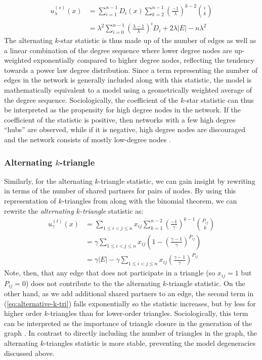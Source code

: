  \begin{align}
 \label{eq:alternative-k-star}
 u_\lambda^{(s)}(x) & = \sum_{i = 1}^{n-1} D_i(x) \sum_{k = 2}^{n-1} \left(\frac{-1}{\lambda}\right)^{k-2} \binom{i}{k}   \nonumber\\
 & =  \lambda^2 \sum_{i = 0}^{n-1} \left(\frac{\lambda - 1}{\lambda}\right)^i D_i + 2 \lambda |E| - n \lambda^2
 \end{align}
The alternating $k$-star statistic is thus made up of the number of edges as well as a linear combination of the degree sequence where lower degree nodes are up-weighted exponentially compared to higher degree nodes, reflecting the tendency towards a power law degree distribution. Since a term representing the number of edges in the network is generally included along with this statistic, the model is mathematically equivalent to a model using a geometrically weighted average of the degree sequence. Sociologically, the coefficient of the $k$-star statistic can thus be interpreted as the propensity for high degree nodes in the network. If the coefficient of the statistic is positive, then networks with a few high degree ``hubs'' are observed, while if it is negative, high degree nodes are discouraged and the network consists of mostly low-degree nodes \cite{Sni+06}.
 
\subsubsection{Alternating $k$-triangle}
 
 Similarly, for the alternating $k$-triangle statistic, we can gain insight by rewriting in terms of the number of shared partners for pairs of nodes. By using this representation of $k$-triangles from  along with the binomial theorem, we can rewrite the \emph{alternating $k$-triangle} statistic as:
\begin{align}
 \label{eq:alternative-k-tri}
u_\gamma^{(t)}(x) & = \sum_{1 \leq i < j \leq n} x_{ij} \sum_{k = 1}^{n-2} \left(\frac{-1}{\gamma}\right)^{k-1}  \binom{P_{ij}}{k} \nonumber\\
& = \gamma \sum_{1 \leq i < j \leq n} x_{ij} \left(1 - \left(\frac{\gamma-1}{\gamma} \right)^{P_{ij}} \right) \nonumber\\
& = \gamma |E| - \gamma \sum_{1 \leq i < j \leq n} x_{ij} \left(\frac{\gamma-1}{\gamma} \right)^{P_{ij}}
\end{align}
Note, then, that any edge that does not participate in a triangle (so $x_{ij} = 1$ but $P_{ij} = 0$) does not contribute to the the alternating $k$-triangle statistic. On the other hand, as we add additional shared partners to an edge, the second term in (\ref{eq:alternative-k-tri}) falls exponentially so the statistic increases, but  by less for higher order $k$-triangles than for lower-order triangles.  Sociologically, this term can be interpreted as the importance of triangle closure in the generation of the graph \cite{GKM09}. In contrast to directly including the number of triangles in the graph, the alternating $k$-triangles statistic is more stable, preventing the model degeneracies discussed above. 

